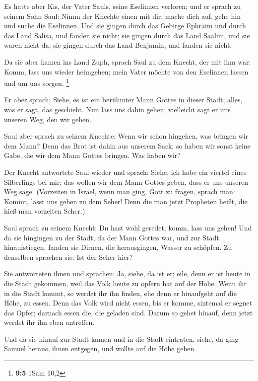  Es hatte aber Kis, der Vater Sauls, seine Eselinnen
verloren; und er sprach zu seinem Sohn Saul: Nimm der Knechte einen mit
dir, mache dich auf, gehe hin und suche die Eselinnen. 
Und sie gingen durch das Gebirge Ephraim und durch das Land Salisa, und
fanden sie nicht; sie gingen durch das Land Saalim, und sie waren nicht
da; sie gingen durch das Land Benjamin, und fanden sie nicht.

 Da sie aber kamen ins Land Zuph, sprach Saul zu dem
Knecht, der mit ihm war: Komm, lass uns wieder heimgehen; mein Vater
möchte von den Eselinnen lassen und um uns sorgen. \footnote{\textbf{9:5}
  1Sam 10,2}

 Er aber sprach: Siehe, es ist ein berühmter Mann Gottes
in dieser Stadt; alles, was er sagt, das geschieht. Nun lass uns dahin
gehen; vielleicht sagt er uns unseren Weg, den wir gehen.

 Saul aber sprach zu seinem Knechte: Wenn wir schon
hingehen, was bringen wir dem Mann? Denn das Brot ist dahin aus unserem
Sack; so haben wir sonst keine Gabe, die wir dem Mann Gottes bringen.
Was haben wir?

 Der Knecht antwortete Saul wieder und sprach: Siehe, ich
habe ein viertel eines Silberlings bei mir; das wollen wir dem Mann
Gottes geben, dass er uns unseren Weg sage.  (Vorzeiten in
Israel, wenn man ging, Gott zu fragen, sprach man: Kommt, lasst uns
gehen zu dem Seher! Denn die man jetzt Propheten heißt, die hieß man
vorzeiten Seher.)

 Saul sprach zu seinem Knecht: Du hast wohl geredet;
komm, lass uns gehen! Und da sie hingingen zu der Stadt, da der Mann
Gottes war,  und zur Stadt hinaufstiegen, fanden sie
Dirnen, die herausgingen, Wasser zu schöpfen. Zu denselben sprachen sie:
Ist der Seher hier?

 Sie antworteten ihnen und sprachen: Ja, siehe, da ist
er; eile, denn er ist heute in die Stadt gekommen, weil das Volk heute
zu opfern hat auf der Höhe.  Wenn ihr in die Stadt kommt,
so werdet ihr ihn finden, ehe denn er hinaufgeht auf die Höhe, zu essen.
Denn das Volk wird nicht essen, bis er komme, sintemal er segnet das
Opfer; darnach essen die, die geladen sind. Darum so gehet hinauf, denn
jetzt werdet ihr ihn eben antreffen.

 Und da sie hinauf zur Stadt kamen und in die Stadt
eintraten, siehe, da ging Samuel heraus, ihnen entgegen, und wollte auf
die Höhe gehen.


